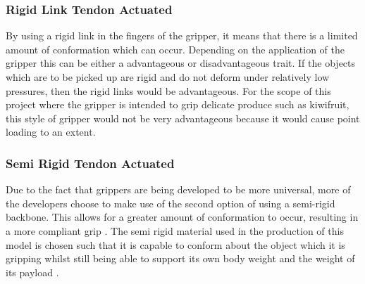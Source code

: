 \documentclass[11pt,twocolumn]{article}
\begin{document}
\subsubsection{Rigid Link Tendon Actuated}
By using a rigid link in the fingers of the gripper, it means that there is a limited amount of conformation which can occur. Depending on the application of the gripper this can be either a advantageous or disadvantageous trait. If the objects which are to be picked up are rigid and do not deform under relatively low pressures, then the rigid links would be advantageous. For the scope of this project where the gripper is intended to grip delicate produce such as kiwifruit, this style of gripper would not be very advantageous because it would cause point loading to an extent.

\subsubsection{Semi Rigid Tendon Actuated}
Due to the fact that grippers are being developed to be more universal, more of the developers choose to make use of the second option of using a semi-rigid backbone. This allows for a greater amount of conformation to occur, resulting in a more compliant grip \cite{marchese2015recipe} . The semi rigid material used in the production of this model is chosen such that it is capable to conform about the object which it is gripping whilst still being able to support its own body weight and the weight of its payload \cite{hassan2015design}.
\end{document}
